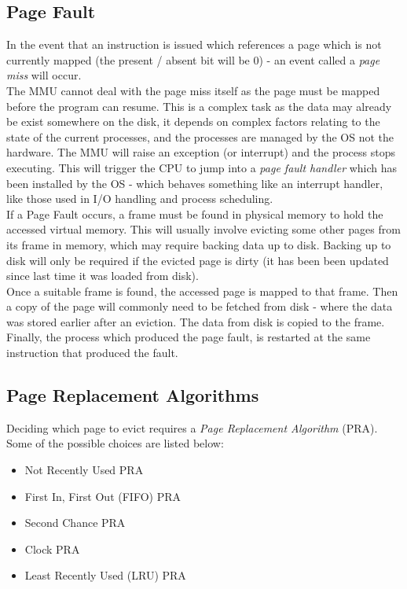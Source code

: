 \subsection{Page Fault}
In the event that an instruction is issued which references a page which is not currently mapped (the present / absent bit will be 0) - an event called a \textit{page miss} will occur.\\

The MMU cannot deal with the page miss itself as the page must be mapped before the program can resume. This is a complex task as the data may already be exist somewhere on the disk, it depends on complex factors relating to the state of the current processes, and the processes are managed by the OS not the hardware. The MMU will raise an exception (or interrupt) and the process stops executing. This will trigger the CPU to jump into a \textit{page fault handler} which has been installed by the OS - which behaves something like an interrupt handler, like those used in I/O handling and process scheduling.\\

If a Page Fault occurs, a frame must be found in physical memory to hold the accessed virtual memory. This will usually involve evicting some other pages from its frame in memory, which may require backing data up to disk. Backing up to disk will only be required if the evicted page is dirty (it has been been updated since last time it was loaded from disk).\\

Once a suitable frame is found, the accessed page is mapped to that frame. Then a copy of the page will commonly need to be fetched from disk - where the data was stored earlier after an eviction. The data from disk is copied to the frame. Finally, the process which produced the page fault, is restarted at the same instruction that produced the fault. 

\subsection{Page Replacement Algorithms}
Deciding which page to evict requires a \textit{Page Replacement Algorithm} (PRA). Some of the possible choices are listed below:
\begin{itemize}
    \item Not Recently Used PRA
    \item First In, First Out (FIFO) PRA
    \item Second Chance PRA
    \item Clock PRA
    \item Least Recently Used (LRU) PRA
\end{itemize}


